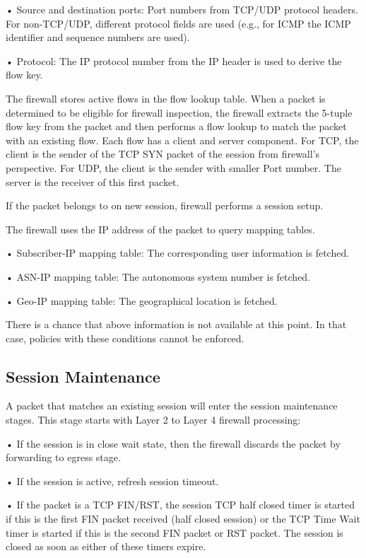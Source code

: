 • Source and destination ports: Port numbers from TCP/UDP protocol headers. For non-TCP/UDP, different protocol fields are used (e.g., for ICMP the ICMP identifier and sequence numbers are used).


• Protocol: The IP protocol number from the IP header is used to derive the flow key. 


The firewall stores active flows in the flow lookup table. When a packet is determined to be eligible for firewall inspection, the firewall extracts the 5-tuple flow key from the packet and then performs a flow lookup to match the packet with an existing flow. Each flow has a client and server component. For TCP, the client is the sender of the TCP SYN packet of the session from firewall’s perspective. For UDP, the client is the sender with smaller Port number. The server is the receiver of this first packet. 


If the packet belongs to on new session, firewall performs a session setup.


The firewall uses the IP address of the packet to query mapping tables.


• Subscriber-IP mapping table: The corresponding user information is fetched.


• ASN-IP mapping table: The autonomous system number is fetched.


• Geo-IP mapping table: The geographical location is fetched.


There is a chance that above information is not available at this point. In that case, policies with these conditions cannot be enforced.

\subsection*{\hypertarget{link:Session Maintenance}{Session Maintenance}}
\label{sec:appendix_e:sequence:maintenance}

A packet that matches an existing session will enter the session maintenance stages. This stage starts with Layer 2 to Layer 4 firewall processing:


• If the session is in close wait state, then the firewall discards the packet by forwarding to egress stage. 


• If the session is active, refresh session timeout.


• If the packet is a TCP FIN/RST, the session TCP half closed timer is started if this is the first FIN packet received (half closed session) or the TCP Time Wait timer is started if this is the second FIN packet or RST packet. The session is closed as soon as either of these timers expire. 


